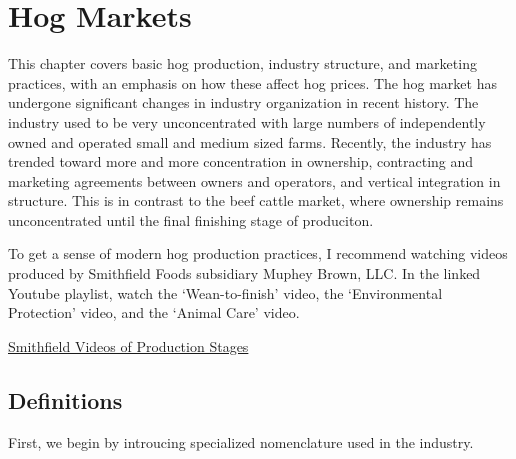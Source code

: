 \documentclass[
]{book}
\begin{document}
\hypertarget{hog-markets}{%
\chapter{Hog Markets}\label{hog-markets}}

This chapter covers basic hog production, industry structure, and marketing practices, with an emphasis on how these affect hog prices. The hog market has undergone significant changes in industry organization in recent history. The industry used to be very unconcentrated with large numbers of independently owned and operated small and medium sized farms. Recently, the industry has trended toward more and more concentration in ownership, contracting and marketing agreements between owners and operators, and vertical integration in structure. This is in contrast to the beef cattle market, where ownership remains unconcentrated until the final finishing stage of produciton.

To get a sense of modern hog production practices, I recommend watching videos produced by Smithfield Foods subsidiary Muphey Brown, LLC. In the linked Youtube playlist, watch the `Wean-to-finish' video, the `Environmental Protection' video, and the `Animal Care' video.

\href{https://www.youtube.com/playlist?list=PL6B939D758396045B}{Smithfield Videos of Production Stages}

\hypertarget{definitions}{%
\section{Definitions}\label{definitions}}

First, we begin by introucing specialized nomenclature used in the industry.
\end{document}
